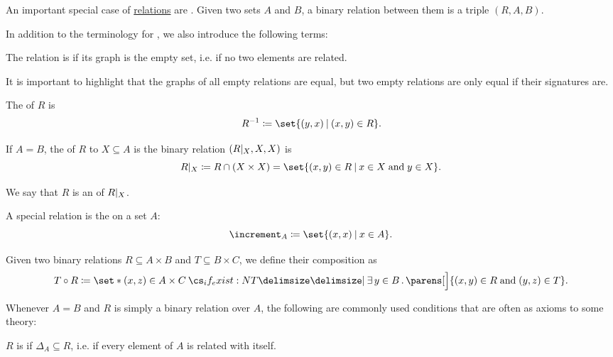 \begin{definition}\label{def:binary_relation}
  An important special case of \hyperref[def:relation]{relations} are . Given two sets \( A \) and \( B \), a binary relation between them is a triple \( (R, A, B) \).

  In addition to the terminology for , we also introduce the following terms:
  \begin{thmenum}[series=def:binary_relation]
     The relation is  if its graph is the empty set, i.e. if no two elements are related.

    It is important to highlight that the graphs of all empty relations are equal, but two empty relations are only equal if their signatures are.

     The  of \( R \) is
    \begin{equation*}
      R^{-1} \coloneqq \set{ (y, x) \given (x, y) \in R }.
    \end{equation*}

     If \( A = B \), the  of \( R \) to \( X \subseteq A \) is the binary relation \( (R\vert_{X}, X, X) \) is
    \begin{equation*}
      R\restr_{X} \coloneqq R \cap (X \times X) = \set{ (x, y) \in R \given x \in X \T{and} y \in X }.
    \end{equation*}

    We say that \( R \) is an  of \( R\vert_{X} \).

     A special relation is the  on a set \( A \):
    \begin{equation*}
      \increment_A \coloneqq \set{ (x, x) \given x \in A }.
    \end{equation*}

     Given two binary relations \( R \subseteq A \times B \) and \( T \subseteq B \times C \), we define their composition as
    \begin{equation*}
      T \bincirc R \coloneqq \set*{ (x, z) \in A \times C \given* \qexists {y \in B} \parens[\Big]{ (x, y) \in R \T{and} (y, z) \in T } }.
    \end{equation*}
  \end{thmenum}

  Whenever \( A = B \) and \( R \) is simply a binary relation over \( A \), the following are commonly used conditions that are often as axioms to some theory:
  \begin{thmenum}[resume=def:binary_relation]
     \( R \) is  if \( \Delta_A \subseteq R \), i.e. if every element of \( A \) is related with itself.


\end{thmenum}
\end{definition}
